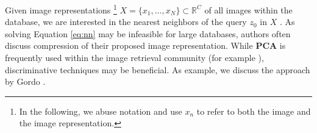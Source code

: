 Given image representations
\footnote{
    In the following, we abuse notation and use $x_n$ to refer to both the image and the image representation.
} $X = \{x_1,\ldots,x_N\} \subset \mathbb{R}^C$ of all images within the database, we are interested in the nearest neighbors of the query $z_0$ in $X$ \cite{JegouDouzeSchmid:2011}.
As solving Equation \eqref{eq:nn} may be infeasible for large databases, authors often discuss compression of their proposed image representation. While \textbf{PCA}
is frequently used within the image retrieval community (for example \cite{BabenkoSlesarevChigorinLempitsky:2014,GeKeSun:2013,ArandjelovicZisserman:2013}), discriminative techniques may be beneficial. As example, we discuss the approach by Gordo \etal \cite{GordoSerranoPerronninValveny:2012}.

